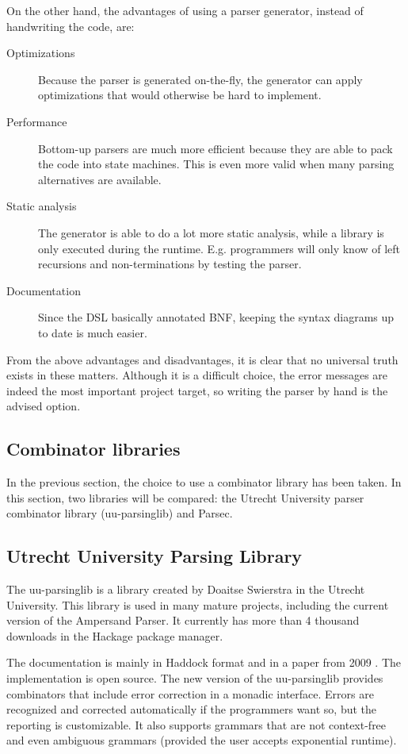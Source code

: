 \noindent
On the other hand, the advantages of using a parser generator, instead of handwriting the code, are:
\begin{description}
	\item[Optimizations] Because the parser is generated on-the-fly, the generator can apply optimizations that would otherwise be hard to implement.
	\item[Performance] Bottom-up parsers are much more efficient because they are able to pack the code into state machines.
		This is even more valid when many parsing alternatives are available.
	\item[Static analysis] The generator is able to do a lot more static analysis, while a library is only executed during the runtime.
    E.g. programmers will only know of left recursions and non-terminations by testing the parser.
	\item[Documentation] Since the DSL basically annotated BNF, keeping the syntax diagrams up to date is much easier.
\end{description}

\noindent
From the above advantages and disadvantages, it is clear that no universal truth exists in these matters.
Although it is a difficult choice, the error messages are indeed the most important project target, so writing the parser by hand is the advised option.

\subsection{Combinator libraries}
In the previous section, the choice to use a combinator library has been taken.
In this section, two libraries will be compared: the Utrecht University parser combinator library (uu-parsinglib) and Parsec.

\subsection{Utrecht University Parsing Library}
%
The uu-parsinglib is a library created by Doaitse Swierstra in the Utrecht University.
This library is used in many mature projects, including the current version of the Ampersand Parser.
It currently has more than 4 thousand downloads in the Hackage package manager.

The documentation is mainly in Haddock format and in a paper from 2009 \cite{uu-doc}.
The implementation is open source.
The new version of the uu-parsinglib provides combinators that include error correction in a monadic interface.
Errors are recognized and corrected automatically if the programmers want so, but the reporting is customizable.
It also supports grammars that are not context-free and even ambiguous grammars (provided the user accepts exponential runtime).

